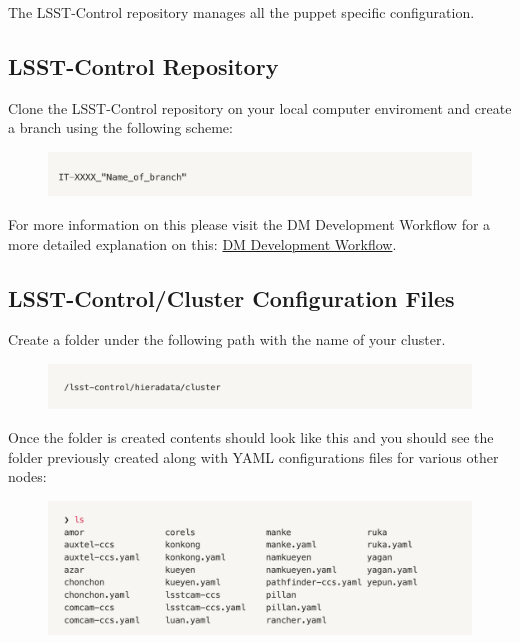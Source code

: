The LSST-Control repository manages all the puppet specific configuration. 

\subsection{LSST-Control Repository}

Clone the LSST-Control repository on your local computer enviroment and create a branch using the following scheme:

\begin{figure}
    \includegraphics[width=12cm]{Images/Image1.png}
    \centering
\end{figure}

For more information on this please visit the DM Development Workflow for a more detailed explanation on this: \href{https://developer.lsst.io/work/flow.html#}{DM Development Workflow}.

\subsection{LSST-Control/Cluster Configuration Files}

Create a folder under the following path with the name of your cluster. 
\begin{figure}
    \includegraphics[width=12cm]{Images/Image2.png}
    \centering
\end{figure}
 

Once the folder is created contents should look like this and you should see the folder previously created along with YAML configurations files for various other nodes:
 
\begin{figure}
     \includegraphics[width=12cm]{Images/Image3.png}
     \centering
\end{figure}

